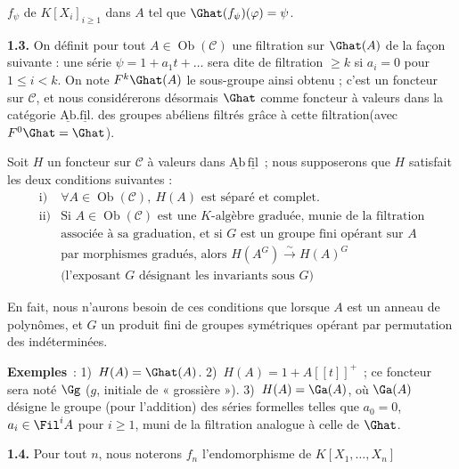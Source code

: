 \(f_\psi\) de \(K[X_i]_{i\geq 1}\) dans \(A\) tel que \(\Ghat(f_\psi)(\varphi)=\psi\).

\textbf{1.3.} On définit pour tout \(A\in\operatorname{Ob}(\mathcal C)\) une filtration sur \(\Ghat(A)\) de la façon suivante : une série \(\psi=1+a_1t+\ldots\) sera dite de filtration \(\geq k\) si \(a_i=0\) pour \(1\leq i<k\). On note \(F^k\Ghat(A)\) le sous-groupe ainsi obtenu ; c'est un foncteur sur \(\mathcal C\), et nous considérerons désormais \(\Ghat\) comme foncteur à valeurs dans la catégorie \(\underline{\mathrm{Ab}}.\underline{\mathrm{fil}}.\) des groupes abéliens filtrés grâce à cette filtration(avec \(F^0\Ghat=\Ghat\)).

Soit \(H\) un foncteur sur \(\mathcal C\) à valeurs dans \(\underline{\mathrm{Ab}}\,\underline{\mathrm{fil}}\)~; nous supposerons que \(H\) satisfait les deux conditions suivantes :
\[
\begin{array}{ll}
\text{i)} & \forall A\in\operatorname{Ob}(\mathcal C),\ H(A)\text{ est séparé et complet}.\\[0.3em]
\text{ii)} & \text{Si }A\in\operatorname{Ob}(\mathcal C)\text{ est une }K\text{-algèbre graduée, munie de la filtration}\\
& \text{associée à sa graduation, et si }G\text{ est un groupe fini opérant sur }A\\
& \text{par morphismes gradués, alors }H(A^G)\xrightarrow{\sim} H(A)^G\\
& \text{(l'exposant }G\text{ désignant les invariants sous }G\text{)}
\end{array}
\]

En fait, nous n'aurons besoin de ces conditions que lorsque \(A\) est un anneau de polynômes, et \(G\) un produit fini de groupes symétriques opérant par permutation des indéterminées.

\textbf{Exemples}~: 1)~\(H(A)=\Ghat(A)\). 2)~\(H(A)=1+A[[t]]^+\)~; ce foncteur sera noté \(\Gg\) (\(g\), initiale de « grossière »). 3)~\(H(A)=\Ga(A)\), où \(\Ga(A)\) désigne le groupe (pour l'addition) des séries formelles telles que \(a_0=0\), \(a_i\in\Fil^i A\) pour \(i\geq 1\), muni de la filtration analogue à celle de \(\Ghat\).

\textbf{1.4.} Pour tout \(n\), nous noterons \(f_n\) l'endomorphisme de \(K[X_1,\ldots,X_n]\)
